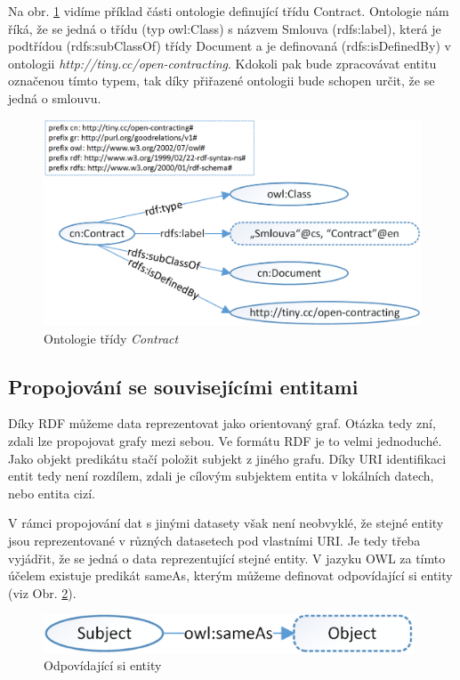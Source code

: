 Na obr. \ref{obr:rdf_ontologyClass} vidíme příklad části ontologie definující třídu Contract. Ontologie nám říká, že se jedná o třídu (typ owl:Class) s názvem Smlouva (rdfs:label), která je podtřídou (rdfs:subClassOf) třídy Document a je definovaná (rdfs:isDefinedBy) v ontologii \textit{http://tiny.cc/open-contracting}. Kdokoli pak bude zpracovávat entitu označenou tímto typem, tak díky přiřazené ontologii bude schopen určit, že se jedná o smlouvu.

\begin{figure}[h]
\centerline{\includegraphics[width=\textwidth]{img/rdf_ontologyClass.eps}}
\caption{Ontologie třídy \textit{Contract}}
\label{obr:rdf_ontologyClass}
\end{figure}

\subsection{Propojování se souvisejícími entitami}

Díky RDF můžeme data reprezentovat jako orientovaný graf. Otázka tedy zní, zdali lze propojovat grafy mezi sebou. Ve formátu RDF je to velmi jednoduché. Jako objekt predikátu stačí položit subjekt z jiného grafu. Díky URI identifikaci entit tedy není rozdílem, zdali je cílovým subjektem entita v lokálních datech, nebo entita cizí.  

V rámci propojování dat s jinými datasety však není neobvyklé, že stejné entity jsou reprezentované v různých datasetech pod vlastními URI. Je tedy třeba vyjádřit, že se jedná o data reprezentující stejné entity. V jazyku OWL za tímto účelem existuje predikát sameAs, kterým můžeme definovat odpovídající si entity (viz Obr. \ref{obr:rdf_ontologyLinks}).

\begin{figure}[h]
\centerline{\includegraphics[width=110mm]{img/rdf_ontologyLinks.eps}}
\caption{Odpovídající si entity}
\label{obr:rdf_ontologyLinks}
\end{figure}

